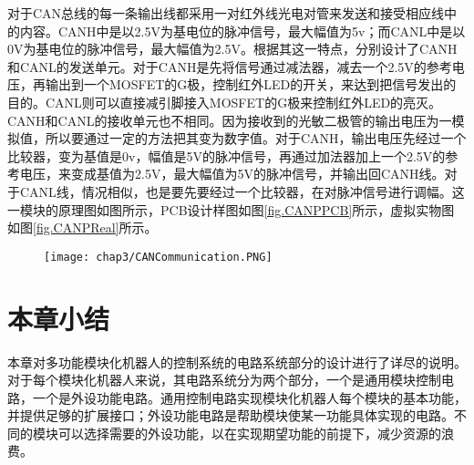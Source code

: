 对于CAN总线的每一条输出线都采用一对红外线光电对管来发送和接受相应线中的内容。CANH中是以2.5V为基电位的脉冲信号，最大幅值为5v；而CANL中是以0V为基电位的脉冲信号，最大幅值为2.5V。根据其这一特点，分别设计了CANH和CANL的发送单元。对于CANH是先将信号通过减法器，减去一个2.5V的参考电压，再输出到一个MOSFET的G极，控制红外LED的开关，来达到把信号发出的目的。CANL则可以直接减引脚接入MOSFET的G极来控制红外LED的亮灭。CANH和CANL的接收单元也不相同。因为接收到的光敏二极管的输出电压为一模拟值，所以要通过一定的方法把其变为数字值。对于CANH，输出电压先经过一个比较器，变为基值是0v，幅值是5V的脉冲信号，再通过加法器加上一个2.5V的参考电压，来变成基值为2.5V，最大幅值为5V的脉冲信号，并输出回CANH线。对于CANL线，情况相似，也是要先要经过一个比较器，在对脉冲信号进行调幅。这一模块的原理图如图所示，PCB设计样图如图\ref{fig.CANPPCB}所示，虚拟实物图如图\ref{fig.CANPReal}所示。
\begin{figure}[!htp]
  \centering
  \texttt{[image: chap3/CANCommunication.PNG]}
\end{figure}
\begin{figure}
  \centering
  \hspace{1in}
\end{figure}
\begin{figure}
  \centering
  \hspace{1in}
\end{figure}
\section{本章小结}
本章对多功能模块化机器人的控制系统的电路系统部分的设计进行了详尽的说明。对于每个模块化机器人来说，其电路系统分为两个部分，一个是通用模块控制电路，一个是外设功能电路。通用控制电路实现模块化机器人每个模块的基本功能，并提供足够的扩展接口；外设功能电路是帮助模块使某一功能具体实现的电路。不同的模块可以选择需要的外设功能，以在实现期望功能的前提下，减少资源的浪费。
